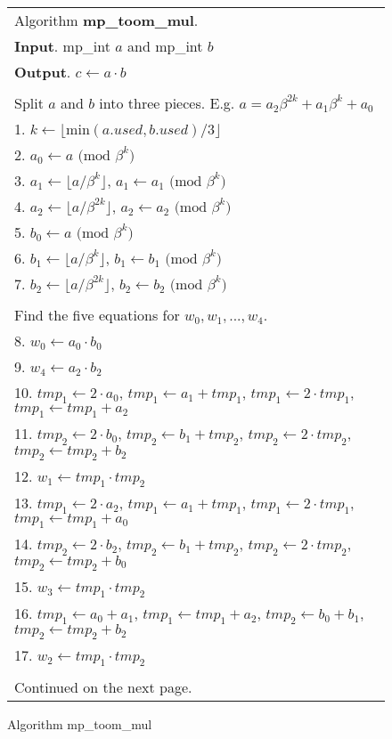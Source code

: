 \documentclass[b5paper]{book}
\begin{document}
\begin{figure}[!here]
\begin{small}
\begin{center}
\begin{tabular}{l}
\hline Algorithm \textbf{mp\_toom\_mul}. \\
\textbf{Input}.   mp\_int $a$ and mp\_int $b$ \\
\textbf{Output}.  $c \leftarrow  a  \cdot  b $ \\
\hline \\
Split $a$ and $b$ into three pieces.  E.g. $a = a_2 \beta^{2k} + a_1 \beta^{k} + a_0$ \\
1.  $k \leftarrow \lfloor \mbox{min}(a.used, b.used) / 3 \rfloor$ \\
2.  $a_0 \leftarrow a \mbox{ (mod }\beta^{k}\mbox{)}$ \\
3.  $a_1 \leftarrow \lfloor a / \beta^k \rfloor$, $a_1 \leftarrow a_1 \mbox{ (mod }\beta^{k}\mbox{)}$ \\
4.  $a_2 \leftarrow \lfloor a / \beta^{2k} \rfloor$, $a_2 \leftarrow a_2 \mbox{ (mod }\beta^{k}\mbox{)}$ \\
5.  $b_0 \leftarrow a \mbox{ (mod }\beta^{k}\mbox{)}$ \\
6.  $b_1 \leftarrow \lfloor a / \beta^k \rfloor$, $b_1 \leftarrow b_1 \mbox{ (mod }\beta^{k}\mbox{)}$ \\
7.  $b_2 \leftarrow \lfloor a / \beta^{2k} \rfloor$, $b_2 \leftarrow b_2 \mbox{ (mod }\beta^{k}\mbox{)}$ \\
\\
Find the five equations for $w_0, w_1, ..., w_4$. \\
8.  $w_0 \leftarrow a_0 \cdot b_0$ \\
9.  $w_4 \leftarrow a_2 \cdot b_2$ \\
10. $tmp_1 \leftarrow 2 \cdot a_0$, $tmp_1 \leftarrow a_1 + tmp_1$, $tmp_1 \leftarrow 2 \cdot tmp_1$, $tmp_1 \leftarrow tmp_1 + a_2$ \\
11. $tmp_2 \leftarrow 2 \cdot b_0$, $tmp_2 \leftarrow b_1 + tmp_2$, $tmp_2 \leftarrow 2 \cdot tmp_2$, $tmp_2 \leftarrow tmp_2 + b_2$ \\
12. $w_1 \leftarrow tmp_1 \cdot tmp_2$ \\
13. $tmp_1 \leftarrow 2 \cdot a_2$, $tmp_1 \leftarrow a_1 + tmp_1$, $tmp_1 \leftarrow 2 \cdot tmp_1$, $tmp_1 \leftarrow tmp_1 + a_0$ \\
14. $tmp_2 \leftarrow 2 \cdot b_2$, $tmp_2 \leftarrow b_1 + tmp_2$, $tmp_2 \leftarrow 2 \cdot tmp_2$, $tmp_2 \leftarrow tmp_2 + b_0$ \\
15. $w_3 \leftarrow tmp_1 \cdot tmp_2$ \\
16. $tmp_1 \leftarrow a_0 + a_1$, $tmp_1 \leftarrow tmp_1 + a_2$, $tmp_2 \leftarrow b_0 + b_1$, $tmp_2 \leftarrow tmp_2 + b_2$ \\
17. $w_2 \leftarrow tmp_1 \cdot tmp_2$ \\
\\
Continued on the next page.\\
\hline
\end{tabular}
\end{center}
\end{small}
\caption{Algorithm mp\_toom\_mul}
\end{figure}
\end{document}
